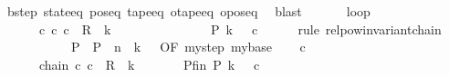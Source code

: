 \begin{isabellebody}
\ bstep\ state{\isacharunderscore}{\kern0pt}eq\ pos{\isacharunderscore}{\kern0pt}eq\ tape{\isacharunderscore}{\kern0pt}eq\ otape{\isacharunderscore}{\kern0pt}eq\ opos{\isacharunderscore}{\kern0pt}eq\ \isamarkupfalse%
\ blast\isanewline
\ \ \isamarkupfalse%
\isanewline
\ \ \isamarkupfalse%
\ loop{\isacharcolon}{\kern0pt}\isanewline
\ \ \ \ \ \ {\isachardoublequoteopen}{\isasymexists}c{\isacharprime}{\kern0pt}{\isachardot}{\kern0pt}\ {\isacharparenleft}{\kern0pt}c{}{\isacharcomma}{\kern0pt}\ c{\isacharprime}{\kern0pt}{\isacharparenright}{\kern0pt}\ {\isasymin}\ R{\isacharprime}{\kern0pt}\ {\isacharcircum}{\kern0pt}{\isacharcircum}{\kern0pt}\ {\isacharparenleft}{\kern0pt}{\isacharquery}{\kern0pt}k\ {\isacharminus}{\kern0pt}\ {}{\isacharparenright}{\kern0pt}\isanewline
\ \ \ \ \ \ \ \ \ \ \ \ {\isasymand}\ {\isacharquery}{\kern0pt}P\ {\isacharparenleft}{\kern0pt}{\isacharquery}{\kern0pt}k\ {\isacharminus}{\kern0pt}\ {}{\isacharparenright}{\kern0pt}\ c{\isacharprime}{\kern0pt}{\isachardoublequoteclose}\isanewline
\ \ \ \ \isamarkupfalse%
\ {\isacharparenleft}{\kern0pt}rule\ relpow{\isacharunderscore}{\kern0pt}invariant{\isacharunderscore}{\kern0pt}chain\isanewline
\ \ \ \ \ \ \ \ \ \ {\isacharbrackleft}{\kern0pt}\ P\ {\isacharequal}{\kern0pt}\ {\isacharquery}{\kern0pt}P\ \ n\ {\isacharequal}{\kern0pt}\ {\isachardoublequoteopen}{\isacharquery}{\kern0pt}k\ {\isacharminus}{\kern0pt}\ {}{\isachardoublequoteclose}{\isacharcomma}{\kern0pt}\ OF\ mystep\ mybase{\isacharbrackright}{\kern0pt}{\isacharparenright}{\kern0pt}\isanewline
\ \ \isamarkupfalse%
\ c{\isacharprime}{\kern0pt}\ \isanewline
\ \ \ \ \ \ chain{\isacharcolon}{\kern0pt}\ {\isachardoublequoteopen}{\isacharparenleft}{\kern0pt}c{}{\isacharcomma}{\kern0pt}\ c{\isacharprime}{\kern0pt}{\isacharparenright}{\kern0pt}\ {\isasymin}\ R{\isacharprime}{\kern0pt}\ {\isacharcircum}{\kern0pt}{\isacharcircum}{\kern0pt}\ {\isacharparenleft}{\kern0pt}{\isacharquery}{\kern0pt}k\ {\isacharminus}{\kern0pt}\ {}{\isacharparenright}{\kern0pt}{\isachardoublequoteclose}\isanewline
\ \ \ \ \ Pfin{\isacharcolon}{\kern0pt}\ {\isachardoublequoteopen}{\isacharquery}{\kern0pt}P\ {\isacharparenleft}{\kern0pt}{\isacharquery}{\kern0pt}k\ {\isacharminus}{\kern0pt}\ {}{\isacharparenright}{\kern0pt}\ c{\isacharprime}{\kern0pt}{\isachardoublequoteclose}\isanewline
\ \ \ \ \isamarkupfalse%

\end{isabellebody}
